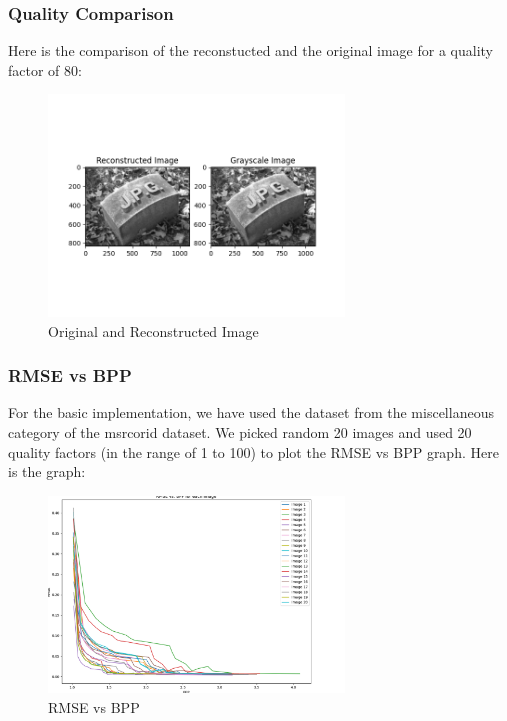 \documentclass[Serif, 10pt, brown]{beamer}
\theoremstyle{example}
\theoremstyle{plain}
\begin{document}
\begin{frame}
	\frametitle{Quality Comparison}
	Here is the comparison of the reconstucted and the original image for a quality factor of 80:
	\begin{figure}
		\centering
		\includegraphics[width=0.7\textwidth]{../results/Quality: 80_comparison.png}
		\caption{Original and Reconstructed Image}
	\end{figure}
\end{frame}

\begin{frame}
	\frametitle{RMSE vs BPP}
	For the basic implementation, we have used the dataset from the miscellaneous category of the msrcorid dataset. We picked random 20 images and used 20 quality factors (in the range of 1 to 100) to plot the RMSE vs BPP graph. Here is the graph:

	\begin{figure}
		\centering
		\includegraphics[width=0.7\textwidth]{../results/basic.png}
		\caption{RMSE vs BPP}
	\end{figure}
	
\end{frame}
\end{document}
